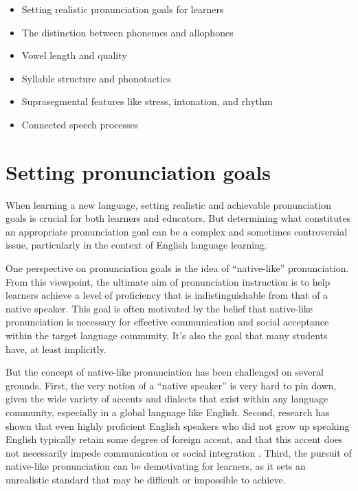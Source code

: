 \begin{itemize}[noitemsep]
    \item Setting realistic pronunciation goals for learners
    \item The distinction between phonemes and allophones
    \item Vowel length and quality
    \item {}Syllable structure and phonotactics
    \item {}Suprasegmental features like stress, intonation, and rhythm
    \item {}Connected speech processes
\end{itemize}

\section{Setting pronunciation goals}

When learning a new language, setting realistic and achievable pronunciation goals is crucial for both learners and educators. But determining what constitutes an appropriate pronunciation goal can be a complex and sometimes controversial issue, particularly in the context of English language learning.

One perspective on pronunciation goals is the idea of ``native-like'' pronunciation. From this viewpoint, the ultimate aim of pronunciation instruction is to help learners achieve a level of proficiency that is indistinguishable from that of a native speaker. This goal is often motivated by the belief that native-like pronunciation is necessary for effective communication and social acceptance within the target language community. It's also the goal that many students have, at least implicitly.

But the concept of native-like pronunciation has been challenged on several grounds. First, the very notion of a ``native speaker'' is very hard to pin down, given the wide variety of accents and dialects that exist within any language community, especially in a global language like English. Second, research has shown that even highly proficient English speakers who did not grow up speaking English typically retain some degree of foreign accent, and that this accent does not necessarily impede communication or social integration \citep{DerwingMunro2009}. Third, the pursuit of native-like pronunciation can be demotivating for learners, as it sets an unrealistic standard that may be difficult or impossible to achieve.

